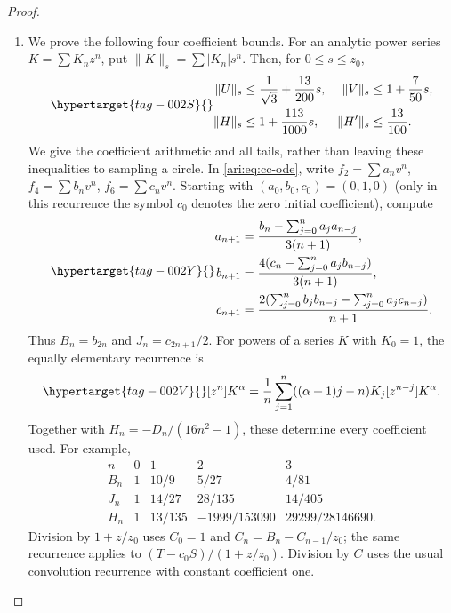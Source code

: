 \begin{proof}
\begin{enumerate}[label=\arabic*.,leftmargin=*]
\item We prove the following four coefficient bounds. For an analytic
power series $K=\sum K_nz^n$, put
$\|K\|_s=\sum|K_n|s^n$. Then, for $0\le s\le z_0$,
\begin{equation}\hypertarget{tag-002S}{}\label{ari:eq:cc-norms}
 \begin{aligned}
 \|U\|_s&\le\frac1{\sqrt3}+\frac{13}{200}s,&
 \|V\|_s&\le1+\frac7{50}s,\\
 \|H\|_s&\le1+\frac{113}{1000}s,&
 \|H'\|_s&\le\frac{13}{100}.
 \end{aligned}
\end{equation}
We give the coefficient arithmetic and all tails, rather than
leaving these inequalities to sampling a circle. In
\eqref{ari:eq:cc-ode}, write $f_2=\sum a_nv^n$,
$f_4=\sum b_nv^n$, $f_6=\sum c_nv^n$. Starting with
$(a_0,b_0,c_0)=(0,1,0)$ (only in this recurrence the symbol
$c_0$ denotes the zero initial coefficient), compute
\begin{equation}\hypertarget{tag-002Y}{}\label{ari:eq:cc-recurrence}
 \begin{aligned}
 a_{n+1}&=\frac{b_n-\sum_{j=0}^na_ja_{n-j}}{3(n+1)},\\
 b_{n+1}&=\frac{4(c_n-\sum_{j=0}^na_jb_{n-j})}{3(n+1)},\\
 c_{n+1}&=\frac{2(\sum_{j=0}^nb_jb_{n-j}-
                          \sum_{j=0}^na_jc_{n-j})}{n+1}.
 \end{aligned}
\end{equation}
Thus $B_n=b_{2n}$ and $J_n=c_{2n+1}/2$. For powers of a series
$K$ with $K_0=1$, the equally elementary recurrence is
\begin{equation}\hypertarget{tag-002V}{}\label{ari:eq:cc-power}
 [z^n]K^\alpha=\frac1n\sum_{j=1}^n
                 ((\alpha+1)j-n)K_j[z^{n-j}]K^\alpha.
\end{equation}
Together with $H_n=-D_n/(16n^2-1)$, these determine every
coefficient used. For example,
\[
 \begin{array}{c|rrrr}
 n&0&1&2&3\\ \hline
 B_n&1&10/9&5/27&4/81\\
 J_n&1&14/27&28/135&14/405\\
 H_n&1&13/135&-1999/153090&29299/28146690.
 \end{array}
\]
Division by $1+z/z_0$ uses $C_0=1$ and
$C_n=B_n-C_{n-1}/z_0$; the same recurrence applies to
$(T-c_0S)/(1+z/z_0)$. Division by $C$ uses the usual
convolution recurrence with constant coefficient one.


\end{enumerate}
\end{proof}
